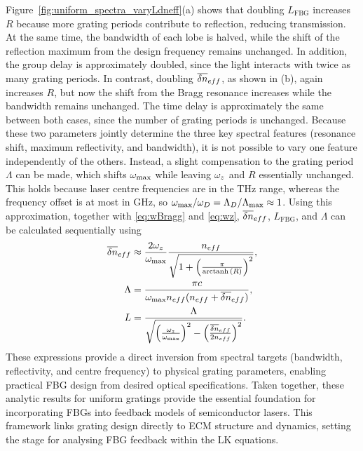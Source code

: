 %
\par
%
Figure~\ref{fig:uniform_spectra_varyLdneff}(a) shows that doubling $L_\text{FBG}$ increases $R$ because more grating periods contribute to reflection, reducing transmission. 
At the same time, the bandwidth of each lobe is halved, while the shift of the reflection maximum from the design frequency remains unchanged. 
In addition, the group delay is approximately doubled, since the light interacts with twice as many grating periods.
In contrast, doubling $\overline{\delta n}_{eff}$, as shown in (b), again increases $R$, but now the shift from the Bragg resonance increases while the bandwidth remains unchanged. 
The time delay is approximately the same between both cases, since the number of grating periods is unchanged.
Because these two parameters jointly determine the three key spectral features (resonance shift, maximum reflectivity, and bandwidth), it is not possible to vary one feature independently of the others.
Instead, a slight compensation to the grating period $\Lambda$ can be made, which shifts $\omega_\text{max}$ while leaving $\omega_z$ and $R$ essentially unchanged.
This holds because laser centre frequencies are in the THz range, whereas the frequency offset is at most in GHz, so $\omega_\text{max}/\omega_D = \Lambda_D/\Lambda_\text{max} \approx 1$.
Using this approximation, together with \eqref{eq:wBragg} and \eqref{eq:wz}, $\overline{\delta n}_{eff}$, $L_\text{FBG}$, and $\Lambda$ can be calculated sequentially using
%
\begin{align}
\label{eq:spec2phys}
    \overline{\delta n}_{eff} &\approx \frac{2\omega_z}{\omega_\text{max}} \frac{n_{eff}}{\sqrt{1 + \left(\frac{\pi}{\operatorname{arctanh}{(R)}} \right)^2}},
    \\
    \Lambda &= \frac{\pi c}{\omega_\text{max} n_{eff} (n_{eff} +\overline{\delta n}_{eff})},
    \\
    L &= \frac{\Lambda}{\sqrt{\left( \frac{\omega_z}{\omega_\text{max}} \right)^2 - \left( \frac{\overline{\delta n}_{eff}}{2n_{eff}} \right)^2}}.
\end{align}
%
These expressions provide a direct inversion from spectral targets (bandwidth, reflectivity, and centre frequency) to physical grating parameters, enabling practical FBG design from desired optical specifications.
Taken together, these analytic results for uniform gratings provide the essential foundation for incorporating FBGs into feedback models of semiconductor lasers. 
This framework links grating design directly to ECM structure and dynamics, setting the stage for analysing FBG feedback within the LK equations.
%
%

